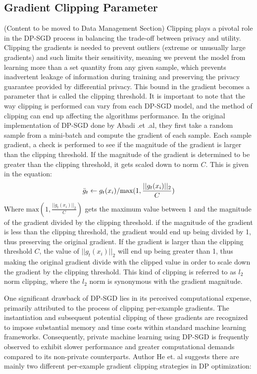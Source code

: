 \documentclass[11pt]{article}
\begin{document}
\subsection{Gradient Clipping Parameter}
(Content to be moved to Data Management Section)
Clipping plays a pivotal role in the DP-SGD process in balancing the trade-off between privacy and utility. Clipping the gradients is needed to prevent outliers (extreme or unusually large gradients) and such limits their sensitivity, meaning we prevent the model from learning more than a set quantity from any given sample, which prevents inadvertent leakage of information during training and preserving the privacy guarantee provided by differential privacy. This bound in the gradient becomes a parameter that is called the clipping threshold. It is important to note that the way clipping is performed can vary from each DP-SGD model, and the method of clipping can end up affecting the algorithms performance. In the original implementation of DP-SGD done by Abadi .et .al\cite{RefWorks:RefID:40-abadi2016deep}, they first take a random sample from a mini-batch and compute the gradient of each sample. Each sample gradient, a check is performed to see if the magnitude of the gradient is larger than the clipping threshold. If the magnitude of the gradient is determined to be greater than the clipping threshold, it gets scaled down to norm $C$. This is given in the equation:
\[ \Bar{g}_t \leftarrow g_t(x_i)/\text{max}(1,\frac{||g_t(x_i)||_2}{C})\]
Where $\text{max}(1,\frac{||g_t(x_i)||_2}{C})$ gets the maximum value between 1 and the magnitude of the gradient divided by the clipping threshold. if the magnitude of the gradient is less than the clipping threshold, the gradient would end up being divided by 1, thus preserving the original gradient. If the gradient is larger than the clipping threshold $C$, the value of $||g_t(x_i)||_2$ will end up being greater than 1, thus making the original gradient divide with the clipped value in order to scale down the gradient by the clipping threshold. This kind of clipping is referred to as $l_2$ norm clipping, where the $l_2$ norm is synonymous with the gradient magnitude.

One significant drawback of DP-SGD lies in its perceived computational expense, primarily attributed to the process of clipping per-example gradients. The instantiation and subsequent potential clipping of these gradients are recognized to impose substantial memory and time costs within standard machine learning frameworks. Consequently, private machine learning using DP-SGD is frequently observed to exhibit slower performance and greater computational demands compared to its non-private counterparts. Author He et. al\cite{RefWorks:RefID:39-he2022exploring} suggests there are mainly two different per-example gradient clipping strategies in DP optimization:
\end{document}
